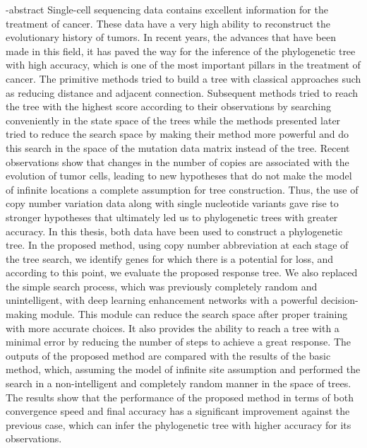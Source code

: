 \en-abstract{
Single-cell sequencing data contains excellent information for the treatment of cancer. These data have a very high ability to reconstruct the evolutionary history of tumors.
In recent years, the advances that have been made in this field, it has paved the way for the inference of the phylogenetic tree with high accuracy, which is one of the most important pillars in the treatment of cancer.
The primitive methods tried to build a tree with classical approaches such as reducing distance and adjacent connection. Subsequent methods tried to reach the tree with the highest score according to their observations by searching conveniently in the state space of the trees while the methods presented later tried to reduce the search space by making their method more powerful and do this search in the space of the mutation data matrix instead of the tree.
Recent observations show that changes in the number of copies are associated with the evolution of tumor cells, leading to new hypotheses that do not make the model of infinite locations a complete assumption for tree construction. Thus, the use of copy number variation data along with single nucleotide variants gave rise to stronger hypotheses that ultimately led us to phylogenetic trees with greater accuracy. In this thesis, both data have been used to construct a phylogenetic tree.
In the proposed method, using copy number abbreviation at each stage of the tree search, we identify genes for which there is a potential for loss, and according to this point, we evaluate the proposed response tree.
We also replaced the simple search process, which was previously completely random and unintelligent, with deep learning enhancement networks with a powerful decision-making module.
This module can reduce the search space after proper training with more accurate choices. It also provides the ability to reach a tree with a minimal error by reducing the number of steps to achieve a great response.
The outputs of the proposed method are compared with the results of the basic method, which, assuming the model of infinite site assumption and performed the search in a non-intelligent and completely random manner in the space of trees. The results show that the performance of the proposed method in terms of both convergence speed and final accuracy has a significant improvement against the previous case, which can infer the phylogenetic tree with higher accuracy for its observations. 
}
